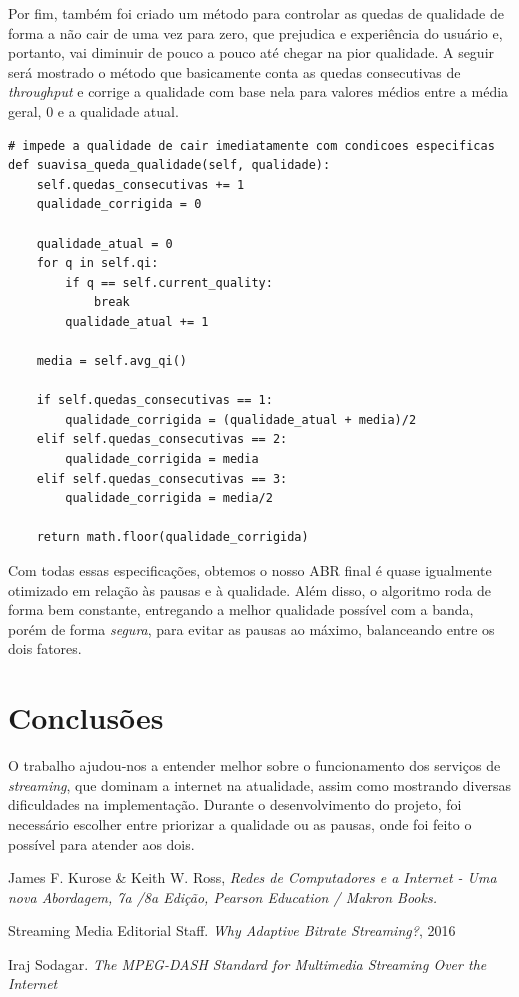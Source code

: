 \documentclass[12pt]{article}
\begin{document}
Por fim, também foi criado um método para controlar as quedas de qualidade de forma a não cair de uma vez para zero, que prejudica e experiência do usuário e, portanto, vai diminuir de pouco a pouco até chegar na pior qualidade. A seguir será mostrado o método que basicamente conta as quedas consecutivas de \textit{throughput} e corrige a qualidade com base nela para valores médios entre a média geral, 0 e a qualidade atual.

\begin{lstlisting}
# impede a qualidade de cair imediatamente com condicoes especificas
def suavisa_queda_qualidade(self, qualidade):
    self.quedas_consecutivas += 1
    qualidade_corrigida = 0

    qualidade_atual = 0
    for q in self.qi:
        if q == self.current_quality:
            break
        qualidade_atual += 1

    media = self.avg_qi()

    if self.quedas_consecutivas == 1:
        qualidade_corrigida = (qualidade_atual + media)/2
    elif self.quedas_consecutivas == 2:
        qualidade_corrigida = media
    elif self.quedas_consecutivas == 3:
        qualidade_corrigida = media/2

    return math.floor(qualidade_corrigida)
\end{lstlisting}

Com todas essas especificações, obtemos o nosso ABR final é quase igualmente otimizado em relação às pausas e à qualidade. Além disso, o algoritmo roda de forma bem constante, entregando a melhor qualidade possível com a banda, porém de forma \textit{segura}, para evitar as pausas ao máximo, balanceando entre os dois fatores.

\section{Conclusões}
O trabalho ajudou-nos a entender melhor sobre o funcionamento dos serviços de \textit{streaming}, que dominam a internet na atualidade, assim como mostrando diversas dificuldades na implementação. Durante o desenvolvimento do projeto, foi necessário escolher entre priorizar a qualidade ou as pausas, onde foi feito o possível para atender aos dois.

\begin{thebibliography}{9}

\noindent James F. Kurose \& Keith W. Ross, 
\textit{Redes de Computadores e a Internet - Uma nova Abordagem, 7a /8a Edição, Pearson Education / Makron Books.}

\noindent Streaming Media Editorial Staff.
\textit{Why Adaptive Bitrate Streaming?}, 2016

\noindent Iraj Sodagar.
\textit{The MPEG-DASH Standard for Multimedia Streaming Over the Internet}

\end{thebibliography}
\end{document}
